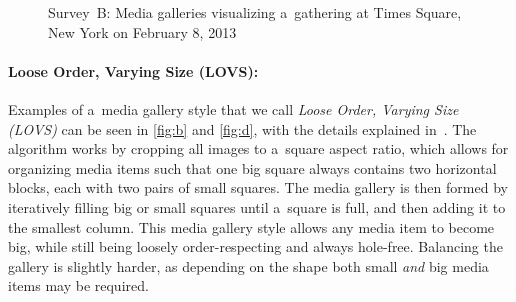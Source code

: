\begin{figure}[t!]
  \centering
  \caption[Survey~B: Media galleries visualizing a~gathering at Times Square]{Survey~B: Media galleries visualizing a~gathering at Times Square, New York on February 8, 2013}
  \label{fig:media-gallery2}  
\end{figure}

\paragraph{Loose Order, Varying Size (LOVS):}

Examples of a~media gallery style
that we call \emph{Loose Order, Varying Size (LOVS)}
can be seen in \autoref{fig:b} and \autoref{fig:d},
with the details explained in~\cite{chedeau2012facebook}.
The algorithm works by cropping all images to a~square aspect ratio,
which allows for organizing media items such that one big square always
contains two horizontal blocks, each with two pairs of small squares.
The media gallery is then formed by iteratively filling
big or small squares until a~square is full,
and then adding it to the smallest column.
This media gallery style allows any media item to become big,
while still being loosely order-respecting and always hole-free.
Balancing the gallery is slightly harder,
as depending on the shape both small \emph{and} big
media items may be required.

